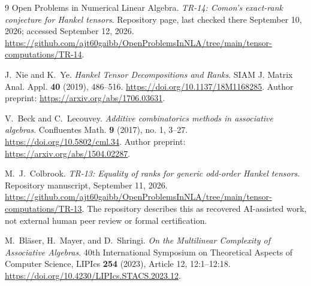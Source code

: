 \documentclass[11pt]{article}
\theoremstyle{definition}
\theoremstyle{remark}
\begin{document}
\begin{thebibliography}{9}
Open Problems in Numerical Linear Algebra.
\emph{TR-14: Comon's exact-rank conjecture for Hankel tensors}.
Repository page, last checked there September 10, 2026; accessed September 12, 2026.
\url{https://github.com/ajt60gaibb/OpenProblemsInNLA/tree/main/tensor-computations/TR-14}.

J.~Nie and K.~Ye.
\emph{Hankel Tensor Decompositions and Ranks}.
SIAM J. Matrix Anal. Appl. \textbf{40} (2019), 486--516.
\url{https://doi.org/10.1137/18M1168285}.
Author preprint: \url{https://arxiv.org/abs/1706.03631}.

V.~Beck and C.~Lecouvey.
\emph{Additive combinatorics methods in associative algebras}.
Confluentes Math. \textbf{9} (2017), no. 1, 3--27.
\url{https://doi.org/10.5802/cml.34}.
Author preprint: \url{https://arxiv.org/abs/1504.02287}.

M.~J.~Colbrook.
\emph{TR-13: Equality of ranks for generic odd-order Hankel tensors}.
Repository manuscript, September 11, 2026.
\url{https://github.com/ajt60gaibb/OpenProblemsInNLA/tree/main/tensor-computations/TR-13}.
The repository describes this as recovered AI-assisted work, not external
human peer review or formal certification.

M.~Bl\"aser, H.~Mayer, and D.~Shringi.
\emph{On the Multilinear Complexity of Associative Algebras}.
40th International Symposium on Theoretical Aspects of Computer Science,
LIPIcs \textbf{254} (2023), Article 12, 12:1--12:18.
\url{https://doi.org/10.4230/LIPIcs.STACS.2023.12}.
\end{thebibliography}
\end{document}
